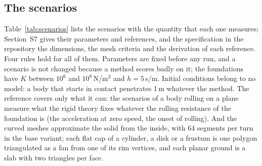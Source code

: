 \subsection{The scenarios}\label{sec:scenarios}

Table~\ref{tab:scenarios} lists the  scenarios with the quantity that
each one measures; Section~S7 gives their parameters and references, and the
specification in the repository the dimensions, the mesh criteria and the derivation of each
reference. Four rules hold for all of them. Parameters are fixed before any run, and a scenario
is not changed because a method scores badly on it; the foundations have $K$ between $10^6$ and
$10^8$\,N/m$^3$ and $h = 5$\,s/m. Initial conditions belong to no model: a body that starts in
contact penetrates 1\,\textmu m whatever the method. The reference covers only what it can: the
scenarios of a body rolling on a plane measure what the rigid theory fixes whatever the rolling
resistance of the foundation is (the acceleration at zero speed, the onset of rolling). And the
curved meshes approximate the solid from the inside, with 64 segments per turn in the base
variant; each flat cap of a cylinder, a disk or a frustum is one polygon triangulated as a fan
from one of its rim vertices, and each planar ground is a slab with two triangles per face.

